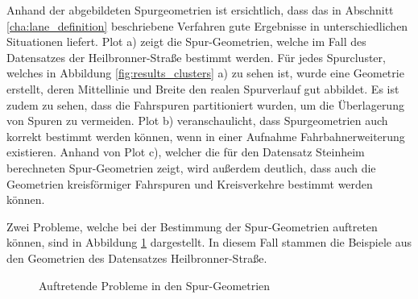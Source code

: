 Anhand der abgebildeten Spurgeometrien ist ersichtlich, dass das in Abschnitt \ref{cha:lane_definition}
beschriebene Verfahren gute Ergebnisse in unterschiedlichen Situationen liefert.
Plot a) zeigt die Spur-Geometrien, welche im Fall des Datensatzes der Heilbronner-Straße bestimmt werden.
Für jedes Spurcluster, welches in Abbildung \ref{fig:results_clusters} a) zu sehen ist, wurde eine Geometrie erstellt,
deren Mittellinie und Breite den realen Spurverlauf gut abbildet. Es ist zudem zu sehen, dass die Fahrspuren
partitioniert wurden, um die Überlagerung von Spuren zu vermeiden.
Plot b) veranschaulicht, dass Spurgeometrien auch korrekt bestimmt werden können, wenn in einer Aufnahme
Fahrbahnerweiterung existieren.
Anhand von Plot c), welcher die für den Datensatz Steinheim berechneten Spur-Geometrien zeigt, wird
außerdem deutlich, dass auch die Geometrien kreisförmiger Fahrspuren und Kreisverkehre bestimmt werden können.

Zwei Probleme, welche bei der Bestimmung der Spur-Geometrien auftreten können, sind in Abbildung
\ref{fig:results_defekts_laneGeos} dargestellt. In diesem Fall stammen die Beispiele aus den Geometrien
des Datensatzes Heilbronner-Straße.

\begin{figure}[H]
    \centering
    \qquad \qquad
    \caption{Auftretende Probleme in den Spur-Geometrien}
    \label{fig:results_defekts_laneGeos}
\end{figure}

